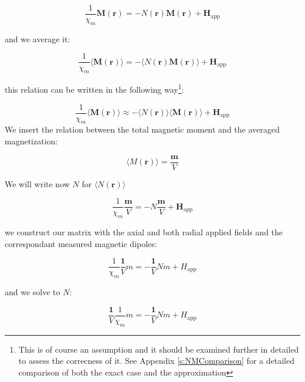 
\begin{equation}
\frac{1}{\chi_m}\textbf{M}(\textbf{r}) = -N(\textbf{r})\textbf{M}(\textbf{r})  + \textbf{H}_\text{app}
\end{equation}

and we average it:

\begin{equation}
\frac{1}{\chi_m}\langle\textbf{M}(\textbf{r})\rangle = -\langle N(\textbf{r})\textbf{M}(\textbf{r})\rangle  + \textbf{H}_\text{app}
\end{equation}

this relation can be written in the following way\footnote{This is of course an assumption and it should be examined further in detailed to assess the correcness of it. See Appendix \ref{s:NMComparison} for a detailed comparison of both the exact case and the approximation}:

\begin{equation}
\frac{1}{\chi_m}\langle\textbf{M}(\textbf{r})\rangle \approx -\langle N(\textbf{r})\rangle\langle\textbf{M}(\textbf{r})\rangle  + \textbf{H}_\text{app}
\end{equation}
 We insert the relation between the total magnetic moment and the averaged magnetization:

\begin{equation}
\langle{M}(\textbf{r})\rangle = \frac{\textbf{m}}{V}
\end{equation}

We will write now $N$ for $\langle N(\textbf{r})\rangle$

\begin{equation}
\frac{1}{\chi_m}\frac{\textbf{m}}{V} = - N\frac{\textbf{m}}{V}  + \textbf{H}_\text{app}
\end{equation}

we construct our matrix with the axial and both radial applied fields and the correspondant measured magnetic dipoles:

\begin{equation}
\frac{1}{\chi_m}\frac{\textbf{1}}{V}m = - \frac{\textbf{1}}{V}N m  + H_\text{app}
\end{equation}

and we solve to $N$:

\begin{equation}
\frac{\textbf{1}}{V}\frac{1}{\chi_m}m = - \frac{\textbf{1}}{V}N m  + H_\text{app}
\end{equation}

